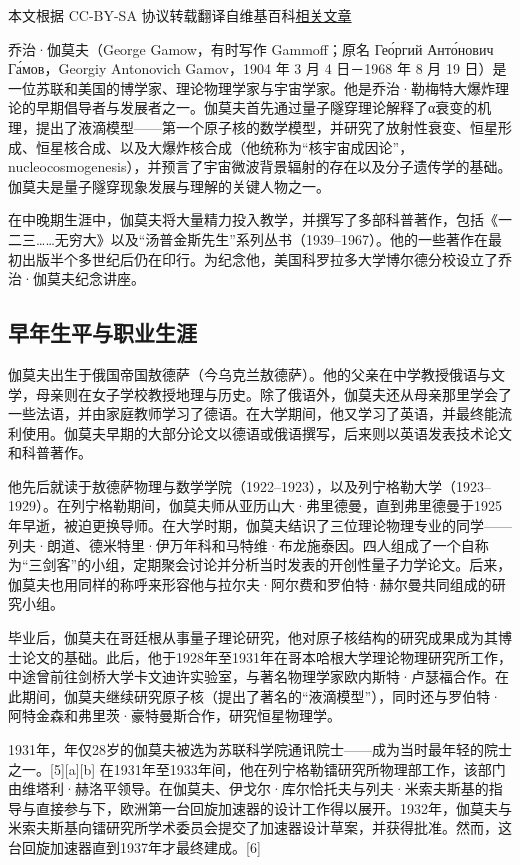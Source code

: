 
本文根据 CC-BY-SA 协议转载翻译自维基百科\href{https://en.wikipedia.org/wiki/George_Gamow}{相关文章}

乔治·伽莫夫（George Gamow，有时写作 Gammoff；原名 Гео́ргий Анто́нович Га́мов，Georgiy Antonovich Gamov，1904 年 3 月 4 日－1968 年 8 月 19 日）是一位苏联和美国的博学家、理论物理学家与宇宙学家。他是乔治·勒梅特大爆炸理论的早期倡导者与发展者之一。伽莫夫首先通过量子隧穿理论解释了α衰变的机理，提出了液滴模型——第一个原子核的数学模型，并研究了放射性衰变、恒星形成、恒星核合成、以及大爆炸核合成（他统称为“核宇宙成因论”，nucleocosmogenesis），并预言了宇宙微波背景辐射的存在以及分子遗传学的基础。伽莫夫是量子隧穿现象发展与理解的关键人物之一。

在中晚期生涯中，伽莫夫将大量精力投入教学，并撰写了多部科普著作，包括《一二三……无穷大》以及“汤普金斯先生”系列丛书（1939–1967）。他的一些著作在最初出版半个多世纪后仍在印行。为纪念他，美国科罗拉多大学博尔德分校设立了乔治·伽莫夫纪念讲座。
\subsection{早年生平与职业生涯}
伽莫夫出生于俄国帝国敖德萨（今乌克兰敖德萨）。他的父亲在中学教授俄语与文学，母亲则在女子学校教授地理与历史。除了俄语外，伽莫夫还从母亲那里学会了一些法语，并由家庭教师学习了德语。在大学期间，他又学习了英语，并最终能流利使用。伽莫夫早期的大部分论文以德语或俄语撰写，后来则以英语发表技术论文和科普著作。

他先后就读于敖德萨物理与数学学院（1922–1923），以及列宁格勒大学（1923–1929）。在列宁格勒期间，伽莫夫师从亚历山大·弗里德曼，直到弗里德曼于1925年早逝，被迫更换导师。在大学时期，伽莫夫结识了三位理论物理专业的同学——列夫·朗道、德米特里·伊万年科和马特维·布龙施泰因。四人组成了一个自称为“三剑客”的小组，定期聚会讨论并分析当时发表的开创性量子力学论文。后来，伽莫夫也用同样的称呼来形容他与拉尔夫·阿尔费和罗伯特·赫尔曼共同组成的研究小组。

毕业后，伽莫夫在哥廷根从事量子理论研究，他对原子核结构的研究成果成为其博士论文的基础。此后，他于1928年至1931年在哥本哈根大学理论物理研究所工作，中途曾前往剑桥大学卡文迪许实验室，与著名物理学家欧内斯特·卢瑟福合作。在此期间，伽莫夫继续研究原子核（提出了著名的“液滴模型”），同时还与罗伯特·阿特金森和弗里茨·豪特曼斯合作，研究恒星物理学。

1931年，年仅28岁的伽莫夫被选为苏联科学院通讯院士——成为当时最年轻的院士之一。[5][a][b] 在1931年至1933年间，他在列宁格勒镭研究所物理部工作，该部门由维塔利·赫洛平领导。在伽莫夫、伊戈尔·库尔恰托夫与列夫·米索夫斯基的指导与直接参与下，欧洲第一台回旋加速器的设计工作得以展开。1932年，伽莫夫与米索夫斯基向镭研究所学术委员会提交了加速器设计草案，并获得批准。然而，这台回旋加速器直到1937年才最终建成。[6]
